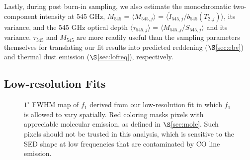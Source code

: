 \documentclass{emulateapj}
\newcommand{\PLANCK}{{\it Planck}}
\begin{document}
Lastly, during post burn-in sampling, we also estimate the monochromatic 
two-component intensity at 545 GHz, $M_{545}$ = $\langle M_{545, j} \rangle$ = 
$\langle \tilde{I}_{545, j}/b_{545}(T_{2,j}) \rangle$, its variance, and
the 545 GHz optical depth $\langle \tau_{545, j} \rangle$ = 
$\langle M_{545, j}/S_{545, j} \rangle$ and its variance. $\tau_{545}$ and 
$M_{545}$ are more readily useful than the sampling parameters themselves for 
translating our fit results into predicted reddening ($\S$\ref{sec:ebv}) and 
thermal dust emission ($\S$\ref{sec:lofreq}), respectively.


\subsection{Low-resolution Fits}
\label{sec:lores}



\begin{figure}
\begin{center}
\caption{\label{fig:f1} $1^{\circ}$ FWHM map of $f_1$ derived from our 
low-resolution fit in which $f_1$ is allowed to vary spatially. Red coloring
masks pixels with appreciable molecular emission, as defined in 
$\S$\ref{sec:mole}. Such pixels should not be trusted in this analysis, which 
is sensitive to the SED shape at low frequencies that are contaminated by CO 
line emission.}
\end{center}
\end{figure}
\end{document}
